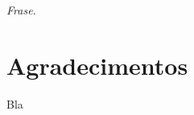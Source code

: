 \thispagestyle{empty}%
\null
\vfill
\begin{flushright}
  \begin{minipage}{.35\linewidth}
    \textit{Frase.}
  \end{minipage}
\end{flushright}

\chapter*{Agradecimentos}
Bla